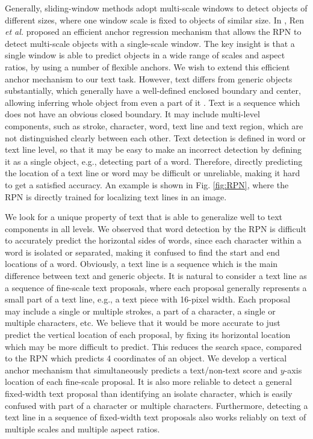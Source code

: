 \documentclass[runningheads]{llncs}
\begin{document}
Generally,  sliding-window methods adopt multi-scale windows to detect objects of different sizes, where one window scale is fixed to objects of similar size. In \cite{Ren2015}, Ren \textit{et al.} proposed an efficient anchor  regression mechanism that allows the RPN to detect multi-scale objects with a single-scale window. The key insight is that a single window is able to predict objects in a wide range
of scales and aspect ratios, by using a number of flexible anchors.  We wish to extend this efficient anchor mechanism to our text task. 
However, text differs from generic objects substantially, which generally have a well-defined enclosed boundary and center, allowing inferring whole object from even a part of it \cite{Cheng2014}.  Text is a sequence which does not have an obvious closed boundary. It may include multi-level components, such as stroke,  character, word, text line and text region, which are not distinguished clearly between each other.  Text detection is defined in word or text line level, so that it may be easy to make an incorrect detection by defining it as  a single object, e.g., detecting part of a word.
Therefore, directly predicting the location of a text line or word may be difficult or unreliable, making it hard to get a satisfied accuracy. An example is shown in Fig. \ref{fig:RPN}, where the RPN is directly trained for localizing text lines in an image.

We look for a unique property of text that is able to generalize well to text components in all levels. 
We observed that word detection by the RPN is difficult to accurately predict the horizontal sides of words, since each character within a word is isolated or separated, making it confused to find the start and end locations of a word. 
Obviously, a text line is  a sequence which is the main difference between text and generic objects.  It is natural to consider a text line as a sequence of fine-scale text proposals, where each proposal  generally  represents a small part of a text line, e.g., a text piece with 16-pixel width. Each proposal may include a single or multiple strokes, a part of a character, a single or multiple characters, etc. 
We believe that it would be more accurate to just predict the vertical location of each proposal, by fixing its horizontal location which may be more difficult to predict.
This reduces the search space, compared to the RPN which predicts 4 coordinates of an object. 
We develop a vertical anchor mechanism that simultaneously predicts a text/non-text score and $y$-axis location of each fine-scale proposal. It is also more reliable to detect a general fixed-width text proposal than identifying  an isolate character, which is easily confused with part of a character or multiple characters.  Furthermore, detecting a text line in a sequence of fixed-width text proposals also works reliably on text of  multiple scales and multiple aspect ratios.
\end{document}
